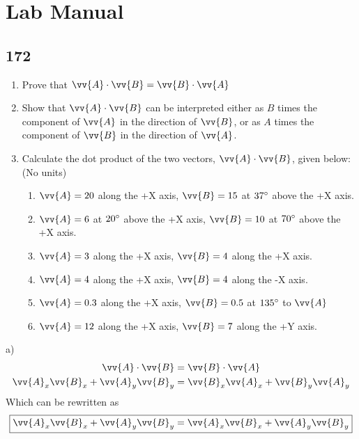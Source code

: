 \documentclass{article}
\begin{document}
\section{Lab Manual}

\subsection{172}

\begin{enumerate}[label=\alph*)]
    \item Prove that $ \vv{A} \cdot \vv{B} = \vv{B} \cdot \vv{A} $
    \item Show that $ \vv{A} \cdot \vv{B} $ can be interpreted either as $ B $ times the component of $ \vv{A} $ in the direction of $ \vv{B} $, or as $ A $ times the component of $ \vv{B} $ in the direction of $ \vv{A} $.
    \item Calculate the dot product of the two vectors, $ \vv{A} \cdot \vv{B} $, given below: (No units)
        \begin{enumerate}[label=\arabic*)]
            \item $ \vv{A} = 20 $ along the +X axis, $ \vv{B} = 15 $ at $ 37\degree $ above the +X axis.
            \item $ \vv{A} = 6 $ at $ 20\degree $ above the +X axis, $ \vv{B} = 10 $ at $ 70\degree $ above the +X axis.
            \item $ \vv{A} = 3 $ along the +X axis, $ \vv{B} = 4 $ along the +X axis.
            \item $ \vv{A} = 4 $ along the +X axis, $ \vv{B} = 4 $ along the -X axis.
            \item $ \vv{A} = 0.3 $ along the +X axis, $ \vv{B} = 0.5 $ at $ 135\degree $ to $ \vv{A} $
            \item $ \vv{A} = 12 $ along the +X axis, $ \vv{B} = 7 $ along the +Y axis.
        \end{enumerate}
\end{enumerate}

a)
\begin{align*}
    \vv{A} \cdot \vv{B} & = \vv{B} \cdot \vv{A} \\
    \vv{A}_x\vv{B}_x + \vv{A}_y\vv{B}_y & = \vv{B}_x\vv{A}_x + \vv{B}_y\vv{A}_y
\end{align*}
Which can be rewritten as
\begin{equation*}
    \boxed{
        \vv{A}_x\vv{B}_x + \vv{A}_y\vv{B}_y = \vv{A}_x\vv{B}_x + \vv{A}_y\vv{B}_y
    }
\end{equation*}
\end{document}
